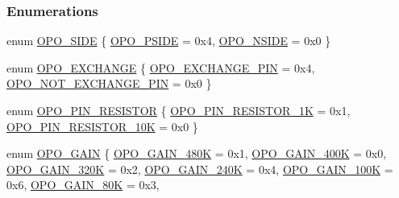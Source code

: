 \subsubsection*{Enumerations}
\begin{DoxyCompactItemize}
\item 
enum \mbox{\hyperlink{a00002_afb2207320139ac264d5cc1600d3cae9e}{O\+P\+O\+\_\+\+S\+I\+DE}} \{ \mbox{\hyperlink{a00002_afb2207320139ac264d5cc1600d3cae9ea740f1053bc0489a53c4cfe9bfc3de403}{O\+P\+O\+\_\+\+P\+S\+I\+DE}} = 0x4, 
\mbox{\hyperlink{a00002_afb2207320139ac264d5cc1600d3cae9eafd1c5b2cbd5e5a8866364e6af2dbd4c0}{O\+P\+O\+\_\+\+N\+S\+I\+DE}} = 0x0
 \}
\item 
enum \mbox{\hyperlink{a00002_af0663f5e9fee7a904ad95d1a4ecdaebd}{O\+P\+O\+\_\+\+E\+X\+C\+H\+A\+N\+GE}} \{ \mbox{\hyperlink{a00002_af0663f5e9fee7a904ad95d1a4ecdaebda8866b250a87989e76add11875358e4ae}{O\+P\+O\+\_\+\+E\+X\+C\+H\+A\+N\+G\+E\+\_\+\+P\+IN}} = 0x4, 
\mbox{\hyperlink{a00002_af0663f5e9fee7a904ad95d1a4ecdaebda4c251187b10da59c8696dbf4951b49d3}{O\+P\+O\+\_\+\+N\+O\+T\+\_\+\+E\+X\+C\+H\+A\+N\+G\+E\+\_\+\+P\+IN}} = 0x0
 \}
\item 
enum \mbox{\hyperlink{a00002_a4600c8687e3e17269633cb3fbd771af9}{O\+P\+O\+\_\+\+P\+I\+N\+\_\+\+R\+E\+S\+I\+S\+T\+OR}} \{ \mbox{\hyperlink{a00002_a4600c8687e3e17269633cb3fbd771af9a7b2e9c0067b4d8197ded8832c5615120}{O\+P\+O\+\_\+\+P\+I\+N\+\_\+\+R\+E\+S\+I\+S\+T\+O\+R\+\_\+1K}} = 0x1, 
\mbox{\hyperlink{a00002_a4600c8687e3e17269633cb3fbd771af9a07e5fc919ceeec7b688aa3389f985a28}{O\+P\+O\+\_\+\+P\+I\+N\+\_\+\+R\+E\+S\+I\+S\+T\+O\+R\+\_\+10K}} = 0x0
 \}
\item 
enum \mbox{\hyperlink{a00002_a6424f6db97a2e691b73af9c4053f1650}{O\+P\+O\+\_\+\+G\+A\+IN}} \{ \newline
\mbox{\hyperlink{a00002_a6424f6db97a2e691b73af9c4053f1650a2b7df29c5ca03fcca36f648dbd2dc95b}{O\+P\+O\+\_\+\+G\+A\+I\+N\+\_\+480K}} = 0x1, 
\mbox{\hyperlink{a00002_a6424f6db97a2e691b73af9c4053f1650ab647d5f1f3b13168dca7f204c08021a8}{O\+P\+O\+\_\+\+G\+A\+I\+N\+\_\+400K}} = 0x0, 
\mbox{\hyperlink{a00002_a6424f6db97a2e691b73af9c4053f1650afd00b530e99b17ea02716d355ecdd695}{O\+P\+O\+\_\+\+G\+A\+I\+N\+\_\+320K}} = 0x2, 
\mbox{\hyperlink{a00002_a6424f6db97a2e691b73af9c4053f1650ad9ddaa398b63e426eb6f7d6c721aa2af}{O\+P\+O\+\_\+\+G\+A\+I\+N\+\_\+240K}} = 0x4, 
\newline
\mbox{\hyperlink{a00002_a6424f6db97a2e691b73af9c4053f1650a1f2a22a037ee965a0b37a2f5c3eed0bc}{O\+P\+O\+\_\+\+G\+A\+I\+N\+\_\+100K}} = 0x6, 
\mbox{\hyperlink{a00002_a6424f6db97a2e691b73af9c4053f1650a42eb5c59d1b93acc89ceb144bbe3fca0}{O\+P\+O\+\_\+\+G\+A\+I\+N\+\_\+80K}} = 0x3, 

\end{DoxyCompactItemize}
